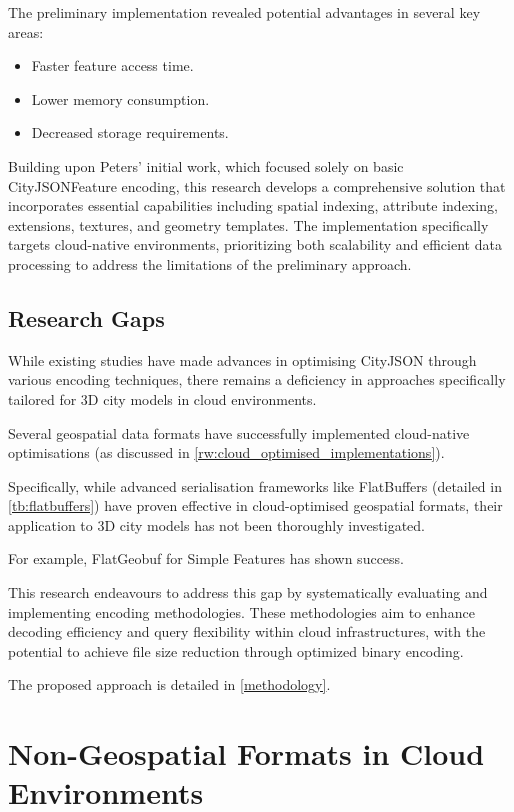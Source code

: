 The preliminary implementation revealed potential advantages in several key areas:

\begin{itemize}
  \item Faster feature access time.
  \item Lower memory consumption.
  \item Decreased storage requirements.
\end{itemize}

Building upon Peters' initial work, which focused solely on basic CityJSONFeature encoding, this research develops a comprehensive solution that incorporates essential capabilities including spatial indexing, attribute indexing, extensions, textures, and geometry templates. The implementation specifically targets cloud-native environments, prioritizing both scalability and efficient data processing to address the limitations of the preliminary approach.

\subsection{Research Gaps}
\label{rw:research_gaps}

While existing studies have made advances in optimising CityJSON through various encoding techniques, there remains a deficiency in approaches specifically tailored for 3D city models in cloud environments.

Several geospatial data formats have successfully implemented cloud-native optimisations (as discussed in \autoref{rw:cloud_optimised_implementations}).

Specifically, while advanced serialisation frameworks like FlatBuffers (detailed in \autoref{tb:flatbuffers}) have proven effective in cloud-optimised geospatial formats, their application to 3D city models has not been thoroughly investigated.

For example, FlatGeobuf for Simple Features \citep{flatgeobuf} has shown success.

This research endeavours to address this gap by systematically evaluating and implementing encoding methodologies.
These methodologies aim to enhance decoding efficiency and query flexibility within cloud infrastructures, with the potential to achieve file size reduction through optimized binary encoding.

The proposed approach is detailed in \autoref{methodology}.

\section{Non-Geospatial Formats in Cloud Environments}
\label{rw:non_geospatial_formats}

